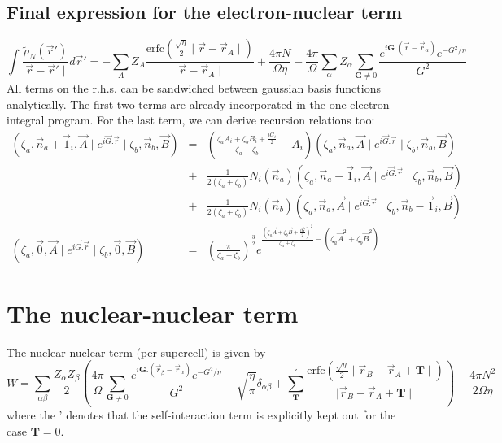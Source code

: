 \documentclass[11pt,a4paper]{article}
\begin{document}
\subsection{Final expression for the electron-nuclear term}
\begin{equation}
\int \frac{\tilde{\rho}_N(\vec{r}')}{\mid \vec{r} - \vec{r}' \mid} d\vec{r}' = - \sum\limits_A Z_A \frac{\text{erfc}\left( \frac{\sqrt{\eta}}{2} \mid \vec{r} - \vec{r}_A \mid \right)}{\mid \vec{r} - \vec{r}_A \mid} + \frac{4 \pi N}{\Omega \eta} - \frac{4 \pi}{\Omega} \sum\limits_{\alpha} Z_{\alpha} \sum\limits_{\mathbf{G} \neq 0} \frac{e^{i \mathbf{G}.(\vec{r} - \vec{r}_{\alpha})} e^{-G^2/\eta}}{G^2} \label{gjgj2}
\end{equation}
All terms on the r.h.s. can be sandwiched between gaussian basis functions analytically. The first two terms are already incorporated in the one-electron integral program. For the last term, we can derive recursion relations too:
\begin{eqnarray}
(\zeta_a,\vec{n}_a+\vec{1}_i,\vec{A} \mid e^{i \vec{G}. \vec{r}} \mid \zeta_b,\vec{n}_b,\vec{B} ) & = & \left( \frac{\zeta_a A_i + \zeta_b B_i + \frac{i G_i}{2}}{\zeta_a + \zeta_b} - A_i \right) (\zeta_a,\vec{n}_a,\vec{A} \mid e^{i \vec{G}. \vec{r}} \mid \zeta_b,\vec{n}_b,\vec{B} ) \nonumber \\
& + & \frac{1}{2(\zeta_a + \zeta_b)} N_i(\vec{n}_a) (\zeta_a,\vec{n}_a-\vec{1}_i,\vec{A} \mid e^{i \vec{G}. \vec{r}} \mid \zeta_b,\vec{n}_b,\vec{B} ) \nonumber \\
& + & \frac{1}{2(\zeta_a + \zeta_b)} N_i(\vec{n}_b) (\zeta_a,\vec{n}_a,\vec{A} \mid e^{i \vec{G}. \vec{r}} \mid \zeta_b,\vec{n}_b -\vec{1}_i,\vec{B} )\\
(\zeta_a,\vec{0},\vec{A} \mid e^{i \vec{G}. \vec{r}} \mid \zeta_b,\vec{0},\vec{B} ) & = & \left( \frac{\pi}{\zeta_a + \zeta_b} \right)^{\frac{3}{2}} e^{\frac{\left( \zeta_a \vec{A} + \zeta_b \vec{B} + \frac{i \vec{G}}{2} \right)^2}{\zeta_a + \zeta_b} - (\zeta_a \vec{A}^2 + \zeta_b \vec{B}^2)}
\end{eqnarray}
\section{The nuclear-nuclear term}
The nuclear-nuclear term (per supercell) is given by
\begin{equation}
W = \sum\limits_{\alpha\beta} \frac{Z_{\alpha}Z_{\beta}}{2} \left( \frac{4\pi}{\Omega} \sum\limits_{\mathbf{G} \neq 0} \frac{e^{i \mathbf{G}.(\vec{r}_{\beta} - \vec{r}_{\alpha})} e^{-G^2/\eta}}{G^2} - \sqrt{\frac{\eta}{\pi}} \delta_{\alpha\beta} + \sum\limits_{\mathbf{T}}^{'} \frac{\text{erfc}\left( \frac{\sqrt{\eta}}{2} \mid \vec{r}_B - \vec{r}_A + \mathbf{T} \mid \right)}{\mid \vec{r}_B - \vec{r}_A + \mathbf{T} \mid}  \right) - \frac{4 \pi N^2}{2 \Omega \eta} \label{gjgj3}
\end{equation}
where the ' denotes that the self-interaction term is explicitly kept out for the case $\mathbf{T} = 0$.
\end{document}
